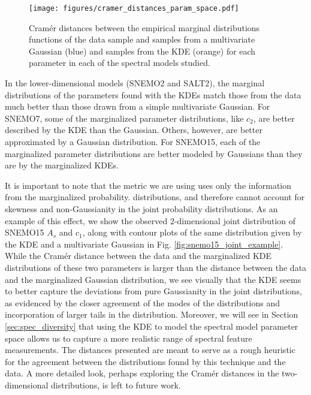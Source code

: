 \begin{figure}
    \centering
    \texttt{[image: figures/cramer\_distances\_param\_space.pdf]}
    \caption{Cram\'{e}r distances between the empirical marginal distributions functions of the data sample and samples from a multivariate Gaussian (blue) and samples from the KDE (orange) for each parameter in each of the spectral models studied.}
    \label{fig:distances}
\end{figure}

In the lower-dimensional models (SNEMO2 and SALT2), the marginal distributions of the parameters found with the KDEs match those from the data much better than those drawn from a simple multivariate Gaussian. For SNEMO7, some of the marginalized parameter distributions, like $c_2$, are better described by the KDE than the Gaussian. Others, however, are better approximated by a Gaussian distribution. For SNEMO15, each of the marginalized parameter distributions are better modeled by Gaussians than they are by the marginalized KDEs. 

It is important to note that the metric we are using uses only the information from the marginalized probability. distributions, and therefore cannot account for skewness and non-Gaussianity in the joint probability distributions. As an example of this effect, we show the observed 2-dimensional joint distribution of SNEMO15 $A_s$ and $c_1$, along with contour plots of the same distribution given by the KDE and a multivariate Gaussian in Fig. \ref{fig:snemo15_joint_example}. While the Cram\'{e}r distance between the data and the marginalized KDE distributions of these two parameters is larger than the distance between the data and the marginalized Gaussian distribution, we see visually that the KDE seems to better capture the deviations from pure Gaussianity in the joint distributions, as evidenced by the closer agreement of the modes of the distributions and incorporation of larger tails in the distribution. Moreover, we will see in Section \ref{sec:spec_diversity} that using the KDE to model the spectral model parameter space allows us to capture a more realistic range of spectral feature measurements. The distances presented are meant to serve as a rough heuristic for the agreement between the distributions found by this technique and the data. A more detailed look, perhaps exploring the Cram\'{e}r distances in the two-dimensional distributions, is left to future work.

